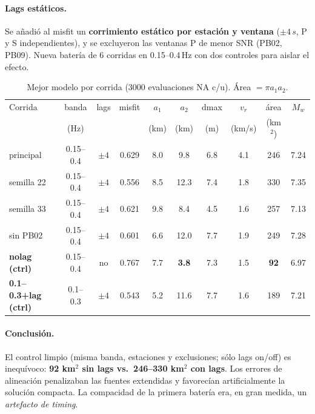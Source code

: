 \documentclass[11pt,a4paper]{article}
\newcommand{\s}{s}
\newcommand{\Hz}{Hz}
\newcommand{\num}[1]{#1}
\newcommand{\SI}[2]{#1\,#2}
\newcommand{\SIrange}[3]{#1--#2\,#3}
\begin{document}
\paragraph{Lags estáticos.} Se añadió al misfit un \textbf{corrimiento estático
por estación y ventana} ($\pm\SI{4}{\s}$, P y S independientes), y se excluyeron
las ventanas P de menor SNR (PB02, PB09). Nueva batería de 6 corridas en
\SIrange{0.15}{0.4}{\Hz} con dos controles para aislar el efecto.

\begin{table}[h]
\centering
\caption{Mejor modelo por corrida (\num{3000} evaluaciones NA c/u).
Área $=\pi a_1 a_2$.}
\small
\begin{tabular}{lccccccccc}
\toprule
Corrida & banda & lags & misfit & $a_1$ & $a_2$ & dmax & $v_r$ & área & $M_w$ \\
        & (Hz)  &      &        & (km)  & (km)  & (m)  & (km/s)& (km$^2$) & \\
\midrule
principal           & 0.15--0.4 & $\pm4$ & 0.629 & 8.0 & 9.8  & 6.8 & 4.1 & 246 & 7.24 \\
semilla 22          & 0.15--0.4 & $\pm4$ & 0.556 & 8.5 & 12.3 & 7.4 & 1.8 & 330 & 7.35 \\
semilla 33          & 0.15--0.4 & $\pm4$ & 0.621 & 9.8 & 8.4  & 4.5 & 1.6 & 257 & 7.13 \\
sin PB02            & 0.15--0.4 & $\pm4$ & 0.601 & 6.6 & 12.0 & 7.7 & 1.9 & 249 & 7.28 \\
\textbf{nolag (ctrl)} & 0.15--0.4 & no    & 0.767 & 7.7 & \textbf{3.8} & 7.3 & 1.5 & \textbf{92} & 6.97 \\
\textbf{0.1--0.3+lag (ctrl)} & 0.1--0.3 & $\pm4$ & 0.543 & 5.2 & 11.6 & 7.7 & 1.6 & 189 & 7.21 \\
\bottomrule
\end{tabular}
\end{table}

\paragraph{Conclusión.} El control limpio (misma banda, estaciones y
exclusiones; sólo lags on/off) es inequívoco: \textbf{92 km$^2$ sin lags vs.\
246--330 km$^2$ con lags}. Los errores de alineación penalizaban las fuentes
extendidas y favorecían artificialmente la solución compacta. La compacidad de
la primera batería era, en gran medida, un \emph{artefacto de timing}.
\end{document}

